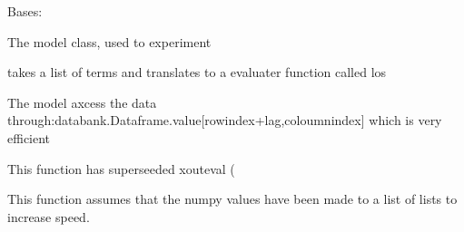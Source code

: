 \documentclass[letterpaper,10pt,english]{sphinxmanual}
\begin{document}
\begin{fulllineitems}
\label{\detokenize{unsorted/modelclass2:modelclass2.simmodel}}
\pysigstartsignatures
{}
\pysigstopsignatures
\sphinxAtStartPar
Bases: {\hyperref[\detokenize{core/modelclass:modelclass.model}]{}}

\sphinxAtStartPar
The model class, used to experiment

\begin{fulllineitems}
\label{\detokenize{unsorted/modelclass2:modelclass2.simmodel.gouteval}}
\pysigstartsignatures
{}
\pysigstopsignatures
\sphinxAtStartPar
takes a list of terms and translates to a evaluater function called los

\sphinxAtStartPar
The model axcess the data through:databank.Dataframe.value{[}rowindex+lag,coloumnindex{]} which is very efficient

\sphinxAtStartPar
This function has superseeded xouteval (

\sphinxAtStartPar
This function assumes that the numpy values have been made to a list of lists to increase speed.

\end{fulllineitems}


\end{fulllineitems}
\end{document}
